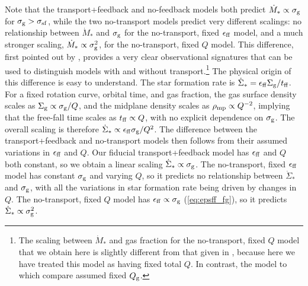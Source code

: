 \documentclass[useAMS,usenatbib]{mn2e}
\begin{document}
Note that the transport+feedback and no-feedback models both predict $\dot{M}_* \propto \sigma_{\rm g}$ for $\sigma_{\rm g} > \sigma_{\rm sf}$, while the two no-transport models predict very different scalings: no relationship between $\dot{M}_*$ and $\sigma_{\rm g}$ for the no-transport, fixed $\epsilon_{\rm ff}$ model, and a much stronger scaling, $\dot{M}_* \propto \sigma_{\rm g}^2$, for the no-transport, fixed $Q$ model. This difference, first pointed out by \citet{krumholz16a}, provides a very clear observational signatures that can be used to distinguish models with and without transport.\footnote{The scaling between $\dot{M}_*$ and gas fraction for the no-transport, fixed $Q$ model that we obtain here is slightly different from that given in \citet{krumholz16a}, because here we have treated this model as having fixed total $Q$. In contrast, the  \citet{faucher-giguere13a} model to which \citet{krumholz16a} compare assumed fixed $Q_{\rm g}$.} The physical origin of this difference is easy to understand. The star formation rate is $\dot{\Sigma}_* = \epsilon_{\rm ff} \Sigma_{\rm g}/t_{\rm ff}$. For a fixed rotation curve, orbital time, and gas fraction, the gas surface density scales as $\Sigma_{\rm g} \propto \sigma_{\rm g} / Q$, and the midplane density scales as $\rho_{\rm mp} \propto Q^{-2}$, implying that the free-fall time scales as $t_{\rm ff} \propto Q$, with no explicit dependence on $\sigma_{\rm g}$. The overall scaling is therefore $\dot{\Sigma}_* \propto \epsilon_{\rm ff} \sigma_{\rm g} / Q^2$. The difference between the transport+feedback and no-transport models then follows from their assumed variations in $\epsilon_{\rm ff}$ and $Q$. Our fiducial transport+feedback model has $\epsilon_{\rm ff}$ and $Q$ both constant, so we obtain a linear scaling $\dot{\Sigma}_* \propto \sigma_{\rm g}$. The no-transport, fixed $\epsilon_{\rm ff}$ model has constant $\sigma_{\rm g}$ and varying $Q$, so it predicts no relationship between $\dot{\Sigma}_*$ and $\sigma_{\rm g}$, with all the variations in star formation rate being driven by changes in $Q$. The no-transport, fixed $Q$ model has $\epsilon_{\rm ff} \propto \sigma_{\rm g}$ (\autoref{eq:epsff_fg}), so it predicts $\dot{\Sigma}_* \propto \sigma_{\rm g}^2$.
\end{document}
